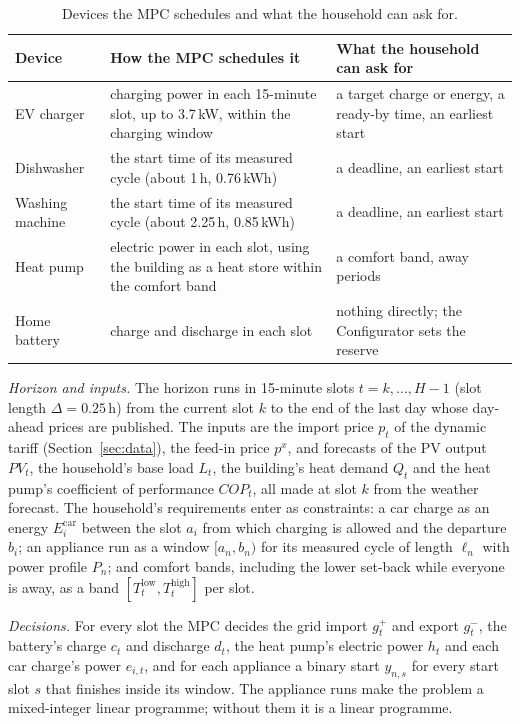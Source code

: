 \documentclass[12pt,a4paper]{report}
\begin{document}
\begin{table}[htbp]
\caption{Devices the MPC schedules and what the household can ask for.}
\label{tab:devices}
\small
\begin{tabularx}{\textwidth}{@{}>{\raggedright\arraybackslash}p{2.6cm}X>{\raggedright\arraybackslash}p{4.4cm}@{}}
\toprule
Device & How the MPC schedules it & What the household can ask for \\
\midrule
EV charger & charging power in each 15-minute slot, up to 3.7\,kW, within the charging window & a target charge or energy, a ready-by time, an earliest start \\
Dishwasher & the start time of its measured cycle (about 1\,h, 0.76\,kWh) & a deadline, an earliest start \\
Washing machine & the start time of its measured cycle (about 2.25\,h, 0.85\,kWh) & a deadline, an earliest start \\
Heat pump & electric power in each slot, using the building as a heat store within the comfort band & a comfort band, away periods \\
Home battery & charge and discharge in each slot & nothing directly; the Configurator sets the reserve \\
\bottomrule
\end{tabularx}
\end{table}

\textit{Horizon and inputs.} The horizon runs in 15-minute slots
$t = k, \dots, H-1$ (slot length $\Delta = 0.25$\,h) from the current
slot $k$ to the end of the last day whose day-ahead prices are
published. The inputs are the import price $p_t$ of the dynamic tariff
(Section~\ref{sec:data}), the feed-in price $p^{x}$, and forecasts of the
PV output $\mathit{PV}_t$, the household's base load $L_t$, the
building's heat demand $Q_t$ and the heat pump's coefficient of
performance $\mathit{COP}_t$, all made at slot $k$ from the weather
forecast. The household's requirements enter as constraints:
a car charge as an energy $E^{\mathrm{car}}_i$ between the slot $a_i$ from
which charging is allowed and the departure $b_i$; an appliance run as a
window $[a_n, b_n)$ for its measured cycle of length $\ell_n$ with power
profile $P_n$; and comfort bands, including the lower set-back while
everyone is away, as a band $[T^{\mathrm{low}}_t, T^{\mathrm{high}}_t]$ per
slot.

\textit{Decisions.} For every slot the MPC decides the grid import
$g^{+}_t$ and export $g^{-}_t$, the battery's charge $c_t$ and discharge
$d_t$, the heat pump's electric power $h_t$ and each car charge's power
$e_{i,t}$, and for each appliance a binary start $y_{n,s}$ for every
start slot $s$ that finishes inside its window. The appliance runs make
the problem a mixed-integer linear programme; without them it is a
linear programme.
\end{document}
